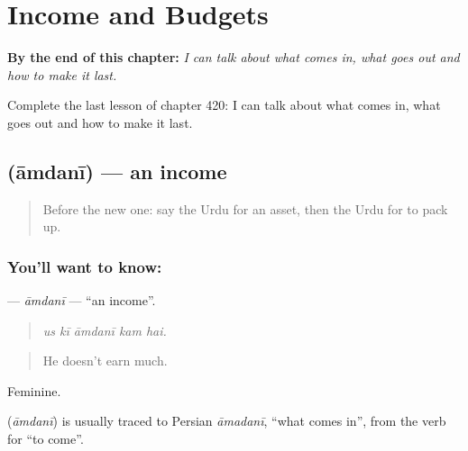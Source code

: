 
\chapter{Income and Budgets}
\label{ch:ur-income-and-budgets}

\begin{chapteropening}
\textbf{By the end of this chapter:} \emph{I can talk about what comes in, what goes out and how to make it last.}

Complete the last lesson of chapter 420: I can talk about what comes in, what goes out and how to make it last.
\end{chapteropening}

\section[\texorpdfstring{\ur{آمدنی} (āmdanī)}{آمدنی (āmdanī)}]{ (āmdanī) — an income}

\label{lesson:UR-C420-amdani}



\begin{quote}
Before the new one: say the Urdu for an asset, then the Urdu for to pack up.
\end{quote}

\subsection*{You'll want to know: }
\textbf{} — \emph{āmdanī} — \textquotedblleft{}an income\textquotedblright{}.

\begin{quote}
    
\end{quote}

\begin{quote}
\emph{us kī āmdanī kam hai.}
\end{quote}

\begin{quote}
He doesn't earn much.
\end{quote}

Feminine.

\begin{cousinweb}
\textbf{} (\emph{āmdanī}) is usually traced to Persian \emph{āmadanī}, \textquotedblleft{}what comes in\textquotedblright{}, from the verb for \textquotedblleft{}to come\textquotedblright{}.
\end{cousinweb}

